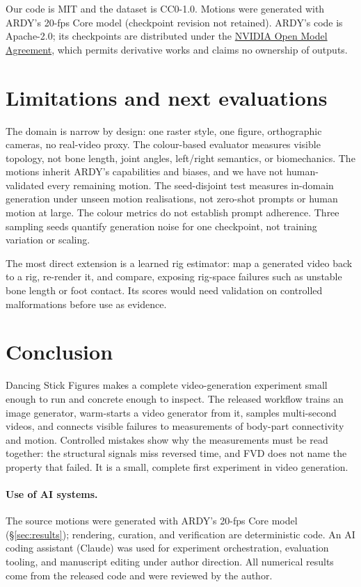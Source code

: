 \documentclass[10pt,twocolumn]{article}
\begin{document}
Our code is MIT and the dataset is CC0-1.0. Motions were generated with ARDY's 20-fps Core model (checkpoint
revision not retained). ARDY's code is Apache-2.0; its checkpoints are distributed under the
\href{https://www.nvidia.com/en-us/agreements/enterprise-software/nvidia-open-model-agreement/}{NVIDIA Open
Model Agreement}, which permits derivative works and claims no ownership of outputs.

\section{Limitations and next evaluations}\label{sec:future}
The domain is narrow by design: one raster style, one figure, orthographic cameras, no real-video proxy. The
colour-based evaluator measures visible topology, not bone length, joint angles, left/right semantics, or
biomechanics. The motions inherit ARDY's capabilities and biases, and we have not human-validated every
remaining motion. The seed-disjoint test measures in-domain generation under unseen motion realisations, not
zero-shot prompts or human motion at large. The colour metrics do not establish prompt adherence. Three
sampling seeds quantify generation noise for one checkpoint, not training variation or scaling.

The most direct extension is a learned rig estimator: map a generated video back to a rig, re-render it, and
compare, exposing rig-space failures such as unstable bone length or foot contact. Its scores would need
validation on controlled malformations before use as evidence.

\section{Conclusion}
Dancing Stick Figures makes a complete video-generation experiment small enough to run and concrete enough to
inspect. The released workflow trains an image generator, warm-starts a video generator from it, samples
multi-second videos, and connects visible failures to measurements of body-part connectivity and motion.
Controlled mistakes show why the measurements must be read together: the structural signals miss reversed time,
and FVD does not name the property that failed. It is a small, complete first experiment in video generation.

\paragraph{Use of AI systems.} The source motions were generated with ARDY's 20-fps Core model
(\S\ref{sec:results}); rendering, curation, and verification are deterministic code. An AI coding assistant
(Claude) was used for experiment orchestration, evaluation tooling, and manuscript editing under author
direction. All numerical results come from the released code and were reviewed by the author.
\end{document}
